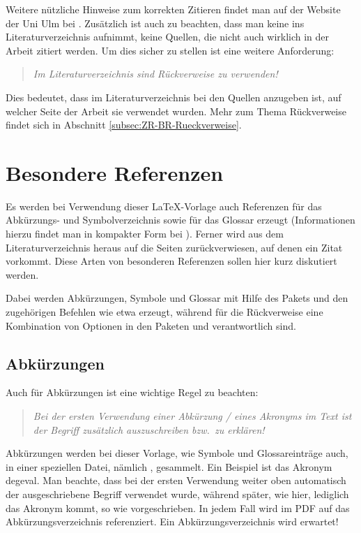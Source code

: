 Weitere nützliche Hinweise zum korrekten Zitieren findet man auf der Website der Uni Ulm 
bei \textcite{Hoelting2018}. Zusätzlich ist auch zu beachten, dass man keine 
ins Literaturverzeichnis aufnimmt, \dh keine Quellen, die nicht auch wirklich in der Arbeit zitiert
werden. Um dies sicher zu stellen ist eine weitere Anforderung:
%
\begin{quote}
\textsl{Im Literaturverzeichnis sind Rückverweise zu verwenden!}
\end{quote}
% 
Dies bedeutet, dass im Literaturverzeichnis bei den Quellen anzugeben ist, auf welcher Seite der Arbeit
sie verwendet wurden. Mehr zum Thema Rückverweise findet sich in Abschnitt \ref{subsec:ZR-BR-Rueckverweise}.
%
%
\section{Besondere Referenzen}
\label{sec:ZR-BesondereReferenzen}
%
Es werden bei Verwendung dieser \LaTeX{}-Vorlage auch Referenzen für das Abkürzungs- und Symbolverzeichnis
sowie für das Glossar erzeugt (Informationen hierzu findet man in kompakter Form bei \textcite{Partosch2015}).
Ferner wird aus dem Literaturverzeichnis heraus auf die Seiten zurückverwiesen, auf denen ein Zitat vorkommt.
Diese Arten von besonderen Referenzen sollen hier kurz diskutiert werden.

Dabei werden Abkürzungen, Symbole und Glossar mit Hilfe des Pakets  und den zugehörigen
Befehlen wie etwa  erzeugt, während für
die Rückverweise eine Kombination von Optionen in den Paketen  und  
verantwortlich sind.
%
\subsection{Abkürzungen}
\label{subsec:ZR-BR-Abkuerzungen}
%
Auch für Abkürzungen ist eine wichtige Regel zu beachten:
%
\begin{quote}
\textsl{Bei der ersten Verwendung einer Abkürzung / eines Akronyms im Text ist
der Begriff zusätzlich auszuschreiben bzw.~zu erklären!}
\end{quote}
%
Abkürzungen werden bei dieser Vorlage, wie Symbole und Glossareinträge auch, in einer speziellen Datei,
nämlich , gesammelt.
Ein Beispiel ist das Akronym \gls{degeval}. Man beachte, dass bei der ersten Verwendung weiter oben
automatisch der ausgeschriebene Begriff verwendet wurde, während später, wie \zB hier, lediglich
das Akronym kommt,
so wie vorgeschrieben. In jedem Fall wird im PDF auf das Abkürzungsverzeichnis referenziert. Ein
Abkürzungsverzeichnis wird erwartet!
%
